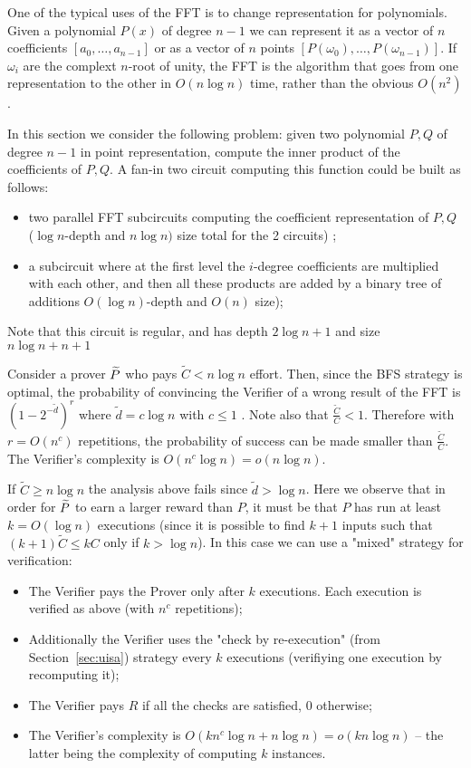 
One of the typical uses of the FFT is to change representation for polynomials. Given a polynomial $P(x)$ of degree $n-1$ we can represent it 
as a vector of $n$ coefficients $[a_0,\ldots,a_{n-1}]$ or as a vector of $n$ points $[P(\omega_0),\ldots,P(\omega_{n-1})]$. If $\omega_i$ are the 
complext $n$-root of unity, the FFT is the algorithm that goes from one representation to the other in $O(n \log n)$ time, rather than the obvious $O(n^2)$. 

In this section we consider the following problem: given two  polynomial $P,Q$ of degree $n-1$ in point representation, compute the inner 
product of the coefficients of $P,Q$. A fan-in two circuit computing this function could be built as follows:
\begin{itemize}
\item two parallel FFT subcircuits computing the coefficient representation of $P,Q$ ($\log n$-depth and $n \log n)$ size total for the 2 circuits) ;
\item a subcircuit where at the first level the $i$-degree coefficients are multiplied with each other, and then all these products are added by a binary tree of
additions $O(\log n)$-depth and $O(n)$ size);
\end{itemize}
Note that this circuit is regular, and has depth $2 \log n +1$ and size $n \log n + n + 1$

Consider a prover $\widetilde{P}$ who pays $\tilde{C}  < n \log n$ effort. Then, since the BFS strategy is optimal, the probability of convincing the Verifier of a wrong result of the FFT is $(1-2^{-\tilde{d}})^r$ where 
$\tilde{d}=c\log n$ with $c \leq 1$ . Note also that 
$\frac{\tilde{C}}{C} < 1$. Therefore with $r=O(n^c)$ repetitions, the probability of
success can be made smaller than $\frac{\tilde{C}}{C}$. The Verifier's complexity is $O(n^c \log n) = o(n \log n)$. 


\bigskip
\noindent
If $\tilde{C} \geq n \log n$ the analysis above fails since $\tilde{d} > \log n$. Here we observe that in order for $\widetilde{P}$ to earn a larger reward than $P$, 
it must be that $P$ has run at least  $k=O(\log n)$ executions (since it is possible to find $k+1$ inputs such that $(k+1)\tilde{C} \leq k C$ only if $k> \log n$).
In this case we can use a "mixed" strategy for verification:
\begin{itemize}
\item The Verifier pays the Prover only after $k$ executions. Each execution is verified as above (with $n^c$ repetitions); 
\item Additionally the Verifier uses the "check by re-execution" (from Section~\ref{sec:uisa}) strategy every $k$ executions (verifiying one execution by
recomputing it);
\item The Verifier pays $R$ if all the checks are satisfied, $0$ otherwise;
\item The Verifier's complexity is $O(k n^c \log n + n \log n) = o(k n \log n)$ -- the latter being the complexity of computing $k$ instances. 
\end{itemize}
 

